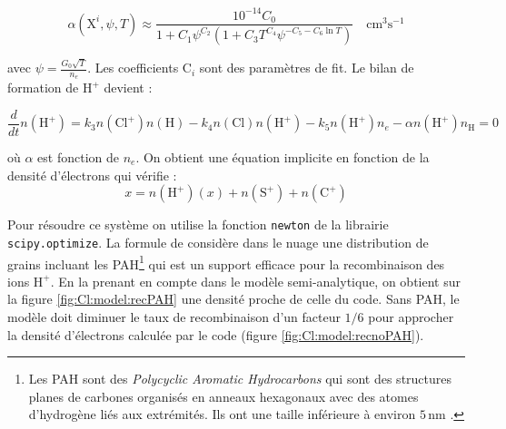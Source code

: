 \begin{equation}
    \alpha \left(\mathrm{X}^{i}, \psi, T\right) \approx \frac{10^{-14} C_{0} }{1+C_{1} \psi^{C_{2}}\left(1+C_{3} T^{C_{4}} \psi^{-C_{5}-C_{6} \ln T}\right)} \quad \mathrm{cm}^{3} \mathrm{s}^{-1}
\end{equation}

avec $\psi = \frac{G_0 \sqrt{T}}{n_e}$. Les coefficients $\mathrm{C}_i$ sont des paramètres de fit. Le bilan de formation de $\mathrm{H}^+$ devient : 

\begin{equation}\label{eq:h+}
    \frac{d}{dt}n(\mathrm{H}^+) = k_3n(\mathrm{Cl}^+)n(\mathrm{H}) - k_4n(\mathrm{Cl})n(\mathrm{H}^+) - k_5 n(\mathrm{H}^+)n_e -\alpha n(\mathrm{H}^+)n_{\mathrm{H}} = 0
\end{equation}

où $\alpha$ est fonction de $n_e$. On obtient une équation implicite en fonction de la densité d'électrons qui vérifie :
\begin{equation}
    x = n(\mathrm{H}^+)(x) + n(\mathrm{S}^+)  + n(\mathrm{C}^+)
\end{equation}

Pour résoudre ce système on utilise la fonction \texttt{newton} de la librairie \texttt{scipy.optimize}. La formule de \cite{Weingartner_2001} considère dans le nuage une distribution de grains incluant les PAH\footnote{Les PAH sont des \textit{Polycyclic Aromatic Hydrocarbons} qui sont des structures planes de carbones organisés en anneaux hexagonaux avec des atomes d'hydrogène liés aux extrémités. Ils ont une taille inférieure à environ $5\,\mathrm{nm}$ \cite{DraineBook}.} qui est un support efficace pour la recombinaison des ions $\mathrm{H}^+$. En la prenant en compte dans le modèle semi-analytique, on obtient sur la figure \ref{fig:Cl:model:recPAH} une densité proche de celle du code. Sans PAH, le modèle doit diminuer le taux de recombinaison d'un facteur $1/6$ pour approcher la densité d'électrons calculée par le code (figure \ref{fig:Cl:model:recnoPAH}).



